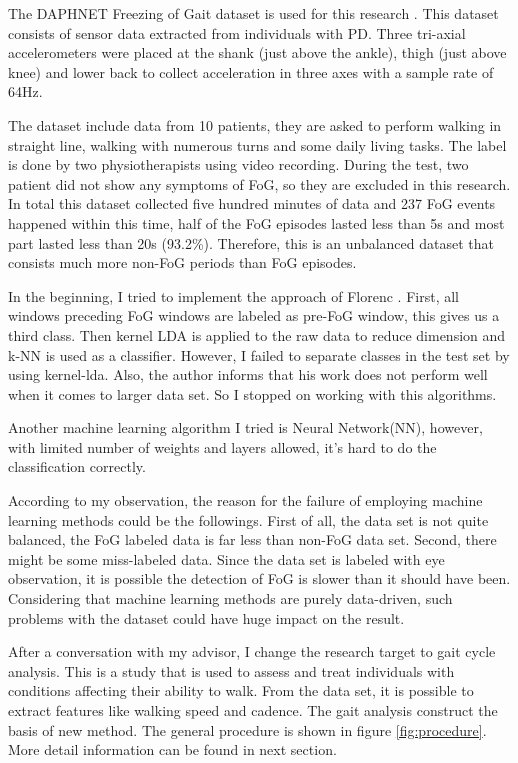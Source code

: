 \documentclass[article]{article}
\begin{document}
 	The DAPHNET Freezing of Gait dataset is used for this research \cite{FI1}. This dataset consists of sensor data extracted from individuals with PD. Three tri-axial accelerometers were placed at the shank (just above the ankle), thigh (just above knee) and lower back to collect acceleration in three axes with a sample rate of 64Hz.

	The dataset include data from 10 patients, they are asked to perform walking in straight line, walking with numerous turns and some daily living tasks. The label is done by two physiotherapists using video recording. During the test, two patient did not show any symptoms of FoG, so they are excluded in this research. In total this dataset collected five hundred minutes of data and 237 FoG events happened within this time, half of the FoG episodes lasted less than 5s and most part lasted less than 20s (93.2\%). Therefore, this is an unbalanced dataset that consists much more non-FoG periods than FoG episodes. 


    In the beginning, I tried to implement the approach of Florenc \cite{Flo}. First, all windows preceding FoG windows are labeled as pre-FoG window, this gives us a third class. Then kernel LDA is applied to the raw data to reduce dimension and k-NN is used as a classifier.  However, I failed to separate classes in the test set by using kernel-lda. Also, the author informs that his work does not perform well when it comes to larger data set. So I stopped on working with this algorithms.
    
    Another machine learning algorithm I tried is Neural Network(NN), however, with limited number of weights and layers allowed, it's hard to do the classification correctly.
    
    According to my observation, the reason for the failure of employing  machine learning methods could be the followings. First of all, the data set is not quite balanced, the FoG labeled data is far less than non-FoG data set.  Second, there might be some miss-labeled data. Since the data set is labeled with eye observation, it is possible the detection of FoG is slower than it should have been. Considering that machine learning methods are purely data-driven, such problems with the dataset could have huge impact on the result.

    After a conversation with my advisor, I change the research target to gait cycle analysis. This is a study that is used to assess and treat individuals with conditions affecting their ability to walk. From the data set, it is possible to extract features like walking speed and cadence. The gait analysis construct the basis of new method. The general procedure is shown in figure \ref{fig:procedure}. More detail information can be found in next section.
    
\end{document}
